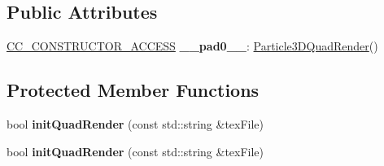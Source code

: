 \subsection*{Public Attributes}
\begin{DoxyCompactItemize}
\item 
\mbox{\label{classParticle3DQuadRender_abd0bcbbb49dc7bd28d4015d589d46847}} 
\hyperlink{_2cocos2d_2cocos_2base_2ccConfig_8h_a25ef1314f97c35a2ed3d029b0ead6da0}{C\+C\+\_\+\+C\+O\+N\+S\+T\+R\+U\+C\+T\+O\+R\+\_\+\+A\+C\+C\+E\+SS} {\bfseries \+\_\+\+\_\+pad0\+\_\+\+\_\+}\+: \hyperlink{classParticle3DQuadRender}{Particle3\+D\+Quad\+Render}()
\end{DoxyCompactItemize}
\subsection*{Protected Member Functions}
\begin{DoxyCompactItemize}
\item 
\mbox{\label{classParticle3DQuadRender_a3ff48fdb2e9bcb45ed8e82f2c1ea25d4}} 
bool {\bfseries init\+Quad\+Render} (const std\+::string \&tex\+File)
\item 
\mbox{\label{classParticle3DQuadRender_a3ff48fdb2e9bcb45ed8e82f2c1ea25d4}} 
bool {\bfseries init\+Quad\+Render} (const std\+::string \&tex\+File)
\end{DoxyCompactItemize}
